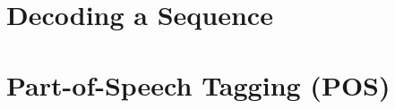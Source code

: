 \section{\label{decoding} Decoding a Sequence}


\section{\label{pos-tagging} Part-of-Speech Tagging (POS)}



%

%


